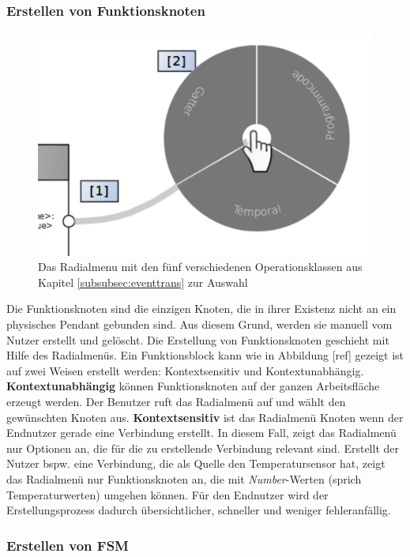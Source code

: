 \subsubsection{Erstellen von Funktionsknoten}

\begin{figure}[h]
  \centering
  \includegraphics[width=.6\textwidth]{bilder/chapter4/chapter4_3/createNodes.pdf}
  \caption{Das Radialmenu mit den fünf verschiedenen Operationsklassen aus Kapitel \ref{subsubsec:eventtrans} zur Auswahl}
  \label{fig:connectNodesInteraction}
\end{figure}
Die Funktionsknoten sind die einzigen Knoten, die in ihrer Existenz nicht an ein physisches Pendant gebunden sind. Aus diesem Grund, werden sie manuell vom Nutzer erstellt und gelöscht. Die Erstellung von Funktionsknoten geschieht mit Hilfe des Radialmenüs. Ein Funktionsblock kann wie in Abbildung [ref] gezeigt ist auf zwei Weisen erstellt werden: Kontextsensitiv und Kontextunabhängig. \textbf{Kontextunabhängig} können Funktionsknoten auf der ganzen Arbeitsfläche erzeugt werden. Der Benutzer ruft das Radialmenü auf und wählt den gewünschten Knoten aus. \textbf{Kontextsensitiv} ist das Radialmenü Knoten wenn der Endnutzer gerade eine Verbindung erstellt. In diesem Fall, zeigt das Radialmenü nur Optionen an, die für die zu erstellende Verbindung relevant sind. Erstellt der Nutzer bspw. eine Verbindung, die als Quelle den Temperatursensor hat, zeigt das Radialmenü nur Funktionsknoten an, die mit \textit{Number}-Werten (sprich Temperaturwerten) umgehen können. Für den Endnutzer wird der Erstellungsprozess dadurch übersichtlicher, schneller und weniger fehleranfällig.

\subsubsection{Erstellen von \ac{FSM}}


